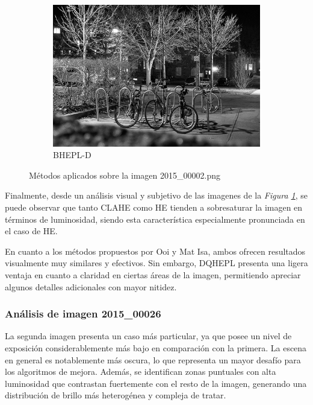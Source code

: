 \documentclass[sigchi]{acmart}
\begin{document}
\begin{figure}[htbp]
	\begin{subfigure}[b]{0.32\textwidth}
		\centering
		\includegraphics[width=\linewidth]{./procesadas/2015_00002/2015_00002_bhepl_d.png}
		\caption{BHEPL-D}
	\end{subfigure}

	\caption{Métodos aplicados sobre la imagen 2015\_00002.png}
	\label{fig:visual_002}
\end{figure}

Finalmente, desde un análisis visual y subjetivo de las imagenes de la \emph{Figura \ref{fig:visual_002}},
se puede observar que tanto CLAHE como HE tienden a sobresaturar la imagen en términos de
luminosidad, siendo esta característica especialmente pronunciada en el caso de HE.

En cuanto a los métodos propuestos por Ooi y Mat Isa, ambos ofrecen resultados visualmente muy
similares y efectivos. Sin embargo, DQHEPL presenta una ligera ventaja en cuanto a claridad en
ciertas áreas de la imagen, permitiendo apreciar algunos detalles adicionales con mayor
nitidez.

\subsubsection{Análisis de imagen 2015\_00026}

La segunda imagen presenta un caso más particular, ya que posee un nivel de exposición
considerablemente más bajo en comparación con la primera. La escena en general es notablemente
más oscura, lo que representa un mayor desafío para los algoritmos de mejora. Además, se
identifican zonas puntuales con alta luminosidad que contrastan fuertemente con el resto de la
imagen, generando una distribución de brillo más heterogénea y compleja de tratar.
\end{document}
